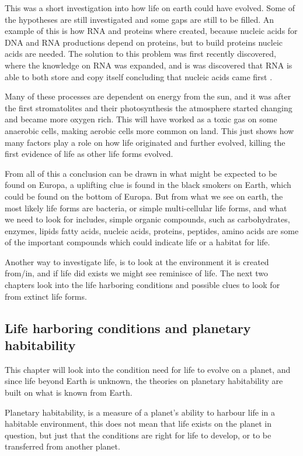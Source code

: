 This was a short investigation into how life on earth could have evolved. Some of the hypotheses are still investigated and some gaps are still to be filled. An example of this is how RNA and proteins where created, because nucleic acids for DNA and RNA productions depend on proteins, but to build proteins nucleic acids are needed. The solution to this problem was first recently discovered, where the knowledge on RNA was expanded, and is was discovered that RNA is able to both store and copy itself concluding that nucleic acids came first \cite{UndestandingEvolution}.

Many of these processes are dependent on energy from the sun, and it was after the first stromatolites and their photosynthesis the atmosphere started changing and became more oxygen rich. This will have worked as a toxic gas on some anaerobic cells, making aerobic cells more common on land. This just shows how many factors play a role on how life originated and further evolved, killing the first evidence of life as other life forms evolved.

From all of this a conclusion can be drawn in what might be expected to be found on Europa, a uplifting clue is found in the black smokers on Earth, which could be found on the bottom of Europa. But from what we see on earth, the most likely life forms are bacteria, or simple multi-cellular life forms, and what we need to look for includes, simple organic compounds, such as carbohydrates, enzymes, lipids fatty acids, nucleic acids, proteins, peptides, amino acids are some of the important compounds which could indicate life or a habitat for life.

Another way to investigate life, is to look at the environment it is created from/in, and if life did exists we might see reminisce of life. The next two chapters look into the life harboring conditions and possible clues to look for from extinct life forms.

\subsection{Life harboring conditions and planetary habitability}

This chapter will look into the condition need for life to evolve on a planet, and since life beyond Earth is unknown, the theories on planetary habitability are built on what is known from Earth.

Planetary habitability, is a measure of a planet's ability to harbour life in a habitable environment\cite{PlanetaryHabitability}, this does not mean that life exists on the planet in question, but just that the conditions are right for life to develop, or to be transferred from another planet.

